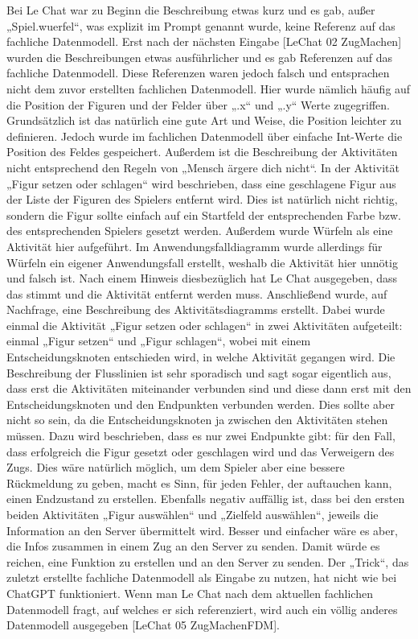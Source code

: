 Bei Le Chat war zu Beginn die Beschreibung etwas kurz und es gab, außer „Spiel.wuerfel“, was explizit im Prompt genannt wurde, keine 
Referenz auf das fachliche Datenmodell. Erst nach der nächsten Eingabe [LeChat 02 ZugMachen] wurden die Beschreibungen etwas ausführlicher 
und es gab Referenzen auf das fachliche Datenmodell. Diese Referenzen waren jedoch falsch und entsprachen nicht dem zuvor erstellten 
fachlichen Datenmodell. Hier wurde nämlich häufig auf die Position der Figuren und der Felder über „.x“ und „.y“ Werte zugegriffen. 
Grundsätzlich ist das natürlich eine gute Art und Weise, die Position leichter zu definieren. Jedoch wurde im fachlichen Datenmodell über 
einfache Int-Werte die Position des Feldes gespeichert. Außerdem ist die Beschreibung der Aktivitäten nicht entsprechend den Regeln von 
„Mensch ärgere dich nicht“. In der Aktivität „Figur setzen oder schlagen“ wird beschrieben, dass eine geschlagene Figur aus der Liste der 
Figuren des Spielers entfernt wird. Dies ist natürlich nicht richtig, sondern die Figur sollte einfach auf ein Startfeld der entsprechenden 
Farbe bzw. des entsprechenden Spielers gesetzt werden. Außerdem wurde Würfeln als eine Aktivität hier aufgeführt. Im Anwendungsfalldiagramm 
wurde allerdings für Würfeln ein eigener Anwendungsfall erstellt, weshalb die Aktivität hier unnötig und falsch ist. Nach einem Hinweis 
diesbezüglich hat Le Chat ausgegeben, dass das stimmt und die Aktivität entfernt werden muss. Anschließend wurde, auf Nachfrage, eine 
Beschreibung des Aktivitätsdiagramms erstellt. Dabei wurde einmal die Aktivität „Figur setzen oder schlagen“ in zwei Aktivitäten aufgeteilt: 
einmal „Figur setzen“ und „Figur schlagen“, wobei mit einem Entscheidungsknoten entschieden wird, in welche Aktivität gegangen wird. Die 
Beschreibung der Flusslinien ist sehr sporadisch und sagt sogar eigentlich aus, dass erst die Aktivitäten miteinander verbunden sind und 
diese dann erst mit den Entscheidungsknoten und den Endpunkten verbunden werden. Dies sollte aber nicht so sein, da die Entscheidungsknoten 
ja zwischen den Aktivitäten stehen müssen. Dazu wird beschrieben, dass es nur zwei Endpunkte gibt: für den Fall, dass erfolgreich die Figur 
gesetzt oder geschlagen wird und das Verweigern des Zugs. Dies wäre natürlich möglich, um dem Spieler aber eine bessere Rückmeldung zu geben, 
macht es Sinn, für jeden Fehler, der auftauchen kann, einen Endzustand zu erstellen. Ebenfalls negativ auffällig ist, dass bei den ersten 
beiden Aktivitäten „Figur auswählen“ und „Zielfeld auswählen“, jeweils die Information an den Server übermittelt wird. Besser und einfacher 
wäre es aber, die Infos zusammen in einem Zug an den Server zu senden. Damit würde es reichen, eine Funktion zu erstellen und an den Server 
zu senden. Der „Trick“, das zuletzt erstellte fachliche Datenmodell als Eingabe zu nutzen, hat nicht wie bei ChatGPT funktioniert. Wenn man 
Le Chat nach dem aktuellen fachlichen Datenmodell fragt, auf welches er sich referenziert, wird auch ein völlig anderes Datenmodell ausgegeben 
[LeChat 05 ZugMachenFDM].

